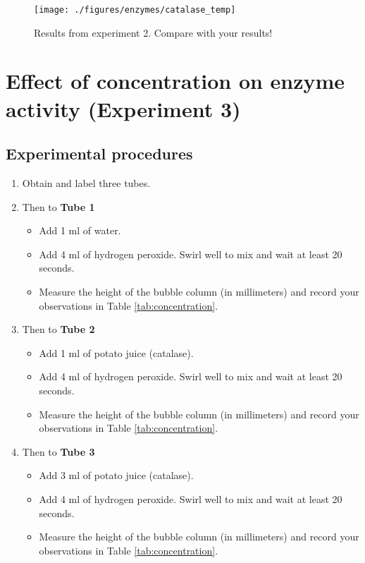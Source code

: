 \documentclass[]{book}
\providecommand{\tightlist}{%
  \setlength{\itemsep}{0pt}\setlength{\parskip}{0pt}}
\theoremstyle{definition}
\theoremstyle{definition}
\theoremstyle{definition}
\theoremstyle{remark}
\begin{document}
\begin{figure}

{\centering \texttt{[image: ./figures/enzymes/catalase\_temp]} 

}

\caption{Results from experiment 2. Compare with your results!}\label{fig:temp}
\end{figure}

\section{Effect of concentration on enzyme activity (Experiment
3)}\label{effect-of-concentration-on-enzyme-activity-experiment-3}

\subsection{Experimental procedures}\label{experimental-procedures-22}

\begin{enumerate}
\def\labelenumi{\arabic{enumi}.}
\tightlist
\item
  Obtain and label three tubes.
\item
  Then to \textbf{Tube 1}

  \begin{itemize}
  \tightlist
  \item
    Add 1 ml of water.
  \item
    Add 4 ml of hydrogen peroxide. Swirl well to mix and wait at least
    20 seconds.
  \item
    Measure the height of the bubble column (in millimeters) and record
    your observations in Table \ref{tab:concentration}.
  \end{itemize}
\item
  Then to \textbf{Tube 2}

  \begin{itemize}
  \tightlist
  \item
    Add 1 ml of potato juice (catalase).
  \item
    Add 4 ml of hydrogen peroxide. Swirl well to mix and wait at least
    20 seconds.
  \item
    Measure the height of the bubble column (in millimeters) and record
    your observations in Table \ref{tab:concentration}.
  \end{itemize}
\item
  Then to \textbf{Tube 3}

  \begin{itemize}
  \tightlist
  \item
    Add 3 ml of potato juice (catalase).
  \item
    Add 4 ml of hydrogen peroxide. Swirl well to mix and wait at least
    20 seconds.
  \item
    Measure the height of the bubble column (in millimeters) and record
    your observations in Table \ref{tab:concentration}.
  \end{itemize}
\end{enumerate}
\end{document}
